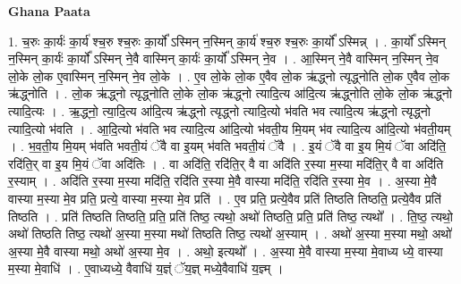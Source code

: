 \documentclass[17pt]{extarticle}
\begin{document}
\textbf{Ghana Paata } \newline

1. च॒रुः का॒र्यः॑ का॒र्य॑ श्च॒रु श्च॒रुः का॒र्यो᳚ ऽस्मिन् न॒स्मिन् का॒र्य॑ श्च॒रु श्च॒रुः का॒र्यो᳚ ऽस्मिन्न् । . का॒र्यो᳚ ऽस्मिन् न॒स्मिन् का॒र्यः॑ का॒र्यो᳚ ऽस्मिन् ने॒वै वास्मिन् का॒र्यः॑ का॒र्यो᳚ ऽस्मिन् ने॒व । . आ॒स्मिन् ने॒वै वास्मिन् न॒स्मिन् ने॒व लो॒के लो॒क ए॒वास्मिन् न॒स्मिन् ने॒व लो॒के । . ए॒व लो॒के लो॒क ए॒वैव लो॒क ऋ॑द्ध्नो त्यृद्ध्नोति लो॒क ए॒वैव लो॒क ऋ॑द्ध्नोति । . लो॒क ऋ॑द्ध्नो त्यृद्ध्नोति लो॒के लो॒क ऋ॑द्ध्नो त्यादि॒त्य आ॑दि॒त्य ऋ॑द्ध्नोति लो॒के लो॒क ऋ॑द्ध्नो त्यादि॒त्यः । . ऋ॒द्ध्नो॒ त्या॒दि॒त्य आ॑दि॒त्य ऋ॑द्ध्नो त्यृद्ध्नो त्यादि॒त्यो भ॑वति भव त्यादि॒त्य ऋ॑द्ध्नो त्यृद्ध्नो त्यादि॒त्यो भ॑वति । . आ॒दि॒त्यो भ॑वति भव त्यादि॒त्य आ॑दि॒त्यो भ॑वती॒य मि॒यम् भ॑व त्यादि॒त्य आ॑दि॒त्यो भ॑वती॒यम् । . भ॒व॒ती॒य मि॒यम् भ॑वति भवती॒यं ॅवै वा इ॒यम् भ॑वति भवती॒यं ॅवै । . इ॒यं ॅवै वा इ॒य मि॒यं ॅवा अदि॑ति॒ रदि॑ति॒र् वा इ॒य मि॒यं ॅवा अदि॑तिः । . वा अदि॑ति॒ रदि॑ति॒र् वै वा अदि॑ति र॒स्या म॒स्या मदि॑ति॒र् वै वा अदि॑ति र॒स्याम् । . अदि॑ति र॒स्या म॒स्या मदि॑ति॒ रदि॑ति र॒स्या मे॒वै वास्या मदि॑ति॒ रदि॑ति र॒स्या मे॒व । . अ॒स्या मे॒वै वास्या म॒स्या मे॒व प्रति॒ प्रत्ये॒ वास्या म॒स्या मे॒व प्रति॑ । . ए॒व प्रति॒ प्रत्ये॒वैव प्रति॑ तिष्ठति तिष्ठति॒ प्रत्ये॒वैव प्रति॑ तिष्ठति । . प्रति॑ तिष्ठति तिष्ठति॒ प्रति॒ प्रति॑ तिष्ठ॒ त्यथो॒ अथो॑ तिष्ठति॒ प्रति॒ प्रति॑ तिष्ठ॒ त्यथो᳚ । . ति॒ष्ठ॒ त्यथो॒ अथो॑ तिष्ठति तिष्ठ॒ त्यथो॑ अ॒स्या म॒स्या मथो॑ तिष्ठति तिष्ठ॒ त्यथो॑ अ॒स्याम् । . अथो॑ अ॒स्या म॒स्या मथो॒ अथो॑ अ॒स्या मे॒वै वास्या मथो॒ अथो॑ अ॒स्या मे॒व । . अथो॒ इत्यथो᳚ । . अ॒स्या मे॒वै वास्या म॒स्या मे॒वाध्य ध्ये॒ वास्या म॒स्या मे॒वाधि॑ । . ए॒वाध्यध्ये॒ वैवाधि॑ य॒ज्ञ्ं ॅय॒ज्ञ् मध्ये॒वैवाधि॑ य॒ज्ञ्म् । \newline
\end{document}
